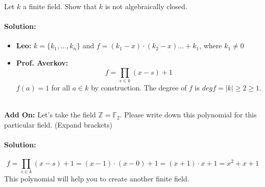 \begin{exercise}[title = Small Exercise 1.1.11a] 
  Let $k$ a finite field. Show that $k$ is not algebraically closed. 
  \paragraph{Solution:} 
  \begin{itemize}
    \item \textbf{Leo:} $k = \{k_1, \ldots, k_n\}$ and $f = (k_1 - x)\cdot(k_2 -x) \dots + k_1$, where $k_1 \neq 0$ 
    \item \textbf{Prof. Averkov:} \[f = \prod_{s \in k}(x -s) + 1\]
    $f(a) = 1$ for all $a \in k$ by construction. The degree of $f$ is $deg f = |k| \geq 2 \geq 1$. 
  \end{itemize} \ \\

  \textbf{Add On:} Let's take the field $\mathbb{Z} = \mathbb{F}_2$. Please write down this polynomial for this particular field. (Expand brackets) 
  \paragraph{Solution:} 
  \[
    f = \prod_{s \in k}(x -s) + 1 = (x -1) \cdot (x -0) + 1  = (x +1) \cdot x + 1 = x^2 + x + 1
   \]
   This polynomial will help you to create another finite field. 
\end{exercise} 

